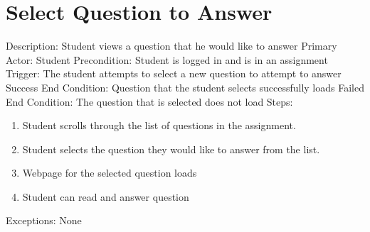     \section{Select Question to Answer}
        Description: Student views a question that he would like to answer \newline
        Primary Actor: Student \newline
        Precondition: Student is logged in and is in an assignment         \newline
        Trigger: The student attempts to select a new question      to attempt to answer \newline
        Success End Condition: Question that the student selects     successfully loads \newline
        Failed End Condition: The question that is selected does     not load \newline
        \newline
        Steps:
        \begin{enumerate}
            \item{Student scrolls through the list of questions in the assignment.}
            \item{Student selects the question they would like to        answer from the list.}
            \item{Webpage for the selected question loads}
            \item{Student can read and answer question}
        \end{enumerate}
        Exceptions: None
        
